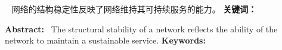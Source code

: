 
\clearpage                                          %
\centerline{\bf \heiti {}\TitleCHS}      
%

\renewenvironment{abstract}
{\par\noindent\textbf{\abstractname}\ \ignorespaces}
{\par\medskip}
\renewcommand\abstractname{}   %


\begin{abstract}\songti                    %
    { %
        网络的结构稳定性反映了网络维持其可持续服务的能力。
    }
    \newline
    \newline
    {\bf \heiti{} 关键词：} 
\end{abstract}

\clearpage
\centerline{\bf \heiti {}\TitleENG}
\renewcommand\abstractname{ Abstract:}    
\begin{abstract}     
    { %
        The structural stability of a network reflects the ability of the network to maintain a sustainable service.
    }
    \newline
    \newline
    {\bf {} Keywords: } { \KeywordsENG}
\end{abstract}
